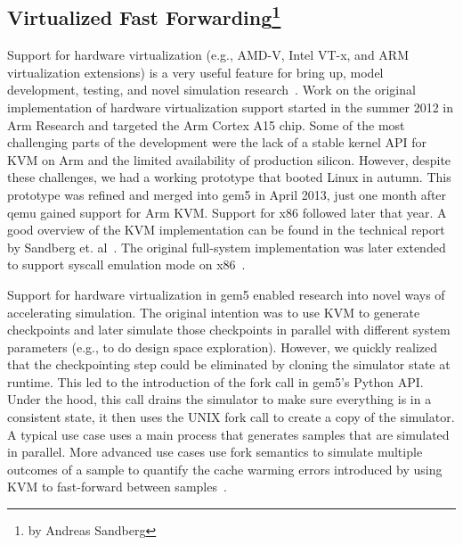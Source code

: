 \subsection[Virtualized Fast Forwarding]{Virtualized Fast Forwarding\footnote{by Andreas Sandberg}}
\label{sec:virtualized-ff}

Support for hardware virtualization (e.g., AMD-V, Intel VT-x, and ARM virtualization extensions) is a very useful feature for bring up, model development, testing, and novel simulation research~\cite{full-speed-ahead, NikolerisSHC16, NikolerisEHC19}.
Work on the original implementation of hardware virtualization support started in the summer 2012 in Arm Research and targeted the Arm Cortex A15 chip. Some of the most challenging parts of the development were the lack of a stable kernel API for KVM on Arm and the limited availability of production silicon.
However, despite these challenges, we had a working prototype that booted Linux in autumn.
This prototype was refined and merged into gem5 in April 2013, just one month after qemu gained support for Arm KVM.
Support for x86 followed later that year.
A good overview of the KVM implementation can be found in the technical report by Sandberg et. al~\cite{full-speed-ahead}.
The original full-system implementation was later extended to support syscall emulation mode on x86~\cite{DutuSlice2015-kvm}.

Support for hardware virtualization in gem5 enabled research into novel ways of accelerating simulation.
The original intention was to use KVM to generate checkpoints and later simulate those checkpoints in parallel with different system parameters (e.g., to do design space exploration).
However, we quickly realized that the checkpointing step could be eliminated by cloning the simulator state at runtime.
This led to the introduction of the fork call in gem5's Python API.
Under the hood, this call drains the simulator to make sure everything is in a consistent state, it then uses the UNIX fork call to create a copy of the simulator.
A typical use case uses a main process that generates samples that are simulated in parallel.
More advanced use cases use fork semantics to simulate multiple outcomes of a sample to quantify the cache warming errors introduced by using KVM to fast-forward between samples~\cite{full-speed-ahead}.
